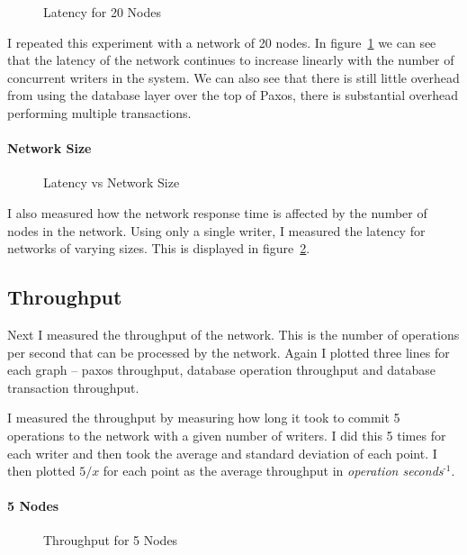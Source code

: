 \documentclass[12pt,twoside,notitlepage]{report}
\newcommand{\lwincludegraphics}[2][]{%
  \sbox{0}{\texttt{[image: \#2]}}%
  \ifdim\wd0>\linewidth
    \resizebox{\linewidth}{!}{\box0 }%
  \else
    \leavevmode\box0
  \fi}
\newcommand{\superscript}[1]{\ensuremath{^{\textrm{#1}}}}
\begin{document}
\begin{figure}[H]
\centering
\lwincludegraphics[scale=2]{figs/lat_20.eps}
\caption{\label{fig:lat-20}Latency for 20 Nodes}
\end{figure}

I repeated this experiment with a network of 20 nodes. In figure~\ref{fig:lat-20} we can see that
the latency of the network continues to increase linearly with the number of concurrent writers in
the system. We can also see that there is still little overhead from using the database layer over
the top of Paxos, there is substantial overhead performing multiple transactions.

\paragraph{Network Size}

\begin{figure}[H]
\centering
\lwincludegraphics[scale=2]{figs/lat_rev.eps}
\caption{\label{fig:latency-rev}Latency vs Network Size}
\end{figure}

I also measured how the network response time is affected by the number of nodes in the network.
Using only a single writer, I measured the latency for networks of varying sizes. This is
displayed in figure~\ref{fig:latency-rev}.

\subsection{Throughput}

Next I measured the throughput of the network. This is the number of operations per second that
can be processed by the network. Again I plotted three lines for each graph -- paxos throughput,
database operation throughput and database transaction throughput.

I measured the throughput by measuring how long it took to commit 5 operations to the network with
a given number of writers. I did this 5 times for each writer and then took the average and
standard deviation of each point. I then plotted $5/x$ for each point as the average throughput in
\emph{operation seconds\superscript{-1}}.

\paragraph{5 Nodes}

\begin{figure}[H]
\centering
\lwincludegraphics[scale=2]{figs/thru_5.eps}
\caption{\label{fig:thruput-5}Throughput for 5 Nodes}
\end{figure}
\end{document}
